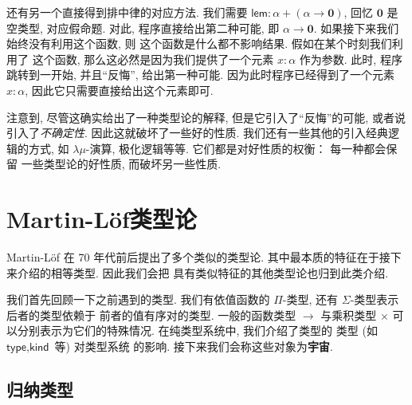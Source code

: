 \documentclass[UTF8]{ctexbook}
\newcommand{\cons}[1]{\textsf{#1}}
\theoremstyle{plain}
\theoremstyle{definition}
\theoremstyle{remark}
\begin{document}
还有另一个直接得到排中律的对应方法. 我们需要
\(\cons{lem} : \alpha + (\alpha \to \mathbf 0)\),
回忆 \(\mathbf 0\) 是空类型, 对应假命题.
对此, 程序直接给出第二种可能, 即 \(\alpha \to \mathbf 0\).
如果接下来我们始终没有利用这个函数, 则
这个函数是什么都不影响结果. 假如在某个时刻我们利用了
这个函数, 那么这必然是因为我们提供了一个元素 \(x : \alpha\)
作为参数. 此时, 程序跳转到一开始, 并且“反悔”,
给出第一种可能. 因为此时程序已经得到了一个元素 \(x : \alpha\),
因此它只需要直接给出这个元素即可.

注意到, 尽管这确实给出了一种类型论的解释, 但是它引入了“反悔”的可能,
或者说引入了\emph{不确定性}. 因此这就破坏了一些好的性质.
我们还有一些其他的引入经典逻辑的方式, 如 \(\lambda\mu\)-演算,
极化逻辑等等. 它们都是对好性质的权衡： 每一种都会保留
一些类型论的好性质, 而破坏另一些性质.

\chapter{Martin-L\"of类型论}\label{martinlof}

Martin-L\"of 在 70 年代前后提出了多个类似的类型论.
其中最本质的特征在于接下来介绍的相等类型. 因此我们会把
具有类似特征的其他类型论也归到此类介绍.

我们首先回顾一下之前遇到的类型. 我们有依值函数的
\(\Pi\)-类型, 还有 \(\Sigma\)-类型表示后者的类型依赖于
前者的值有序对的类型. 一般的函数类型 \(\to\) 与乘积类型
\(\times\) 可以分别表示为它们的特殊情况.
在纯类型系统中, 我们介绍了类型的
类型 (如 \(\cons{type}, \cons{kind}\) 等) 对类型系统
的影响. 接下来我们会称这些对象为\textbf{宇宙}.

\section{归纳类型}
\end{document}
